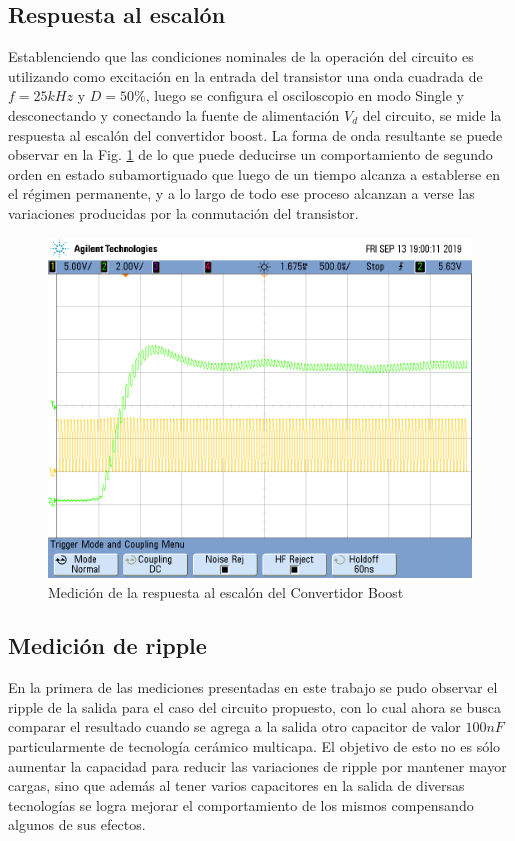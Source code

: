 \subsection{Respuesta al escal\'on}
Establenciendo que las condiciones nominales de la operaci\'on del circuito es utilizando como excitaci\'on en la entrada del transistor una onda cuadrada de $f = 25kHz$ y $D = 50\%$, luego se configura el osciloscopio en modo Single y desconectando
y conectando la fuente de alimentaci\'on $V_d$ del circuito, se mide la respuesta al escal\'on del convertidor boost. La forma de onda resultante se puede observar en la Fig. \ref{fig:respuesta_escalon} de lo que puede deducirse un comportamiento
de segundo orden en estado subamortiguado que luego de un tiempo alcanza a establerse en el r\'egimen permanente, y a lo largo de todo ese proceso alcanzan a verse las variaciones producidas por la conmutaci\'on del transistor.

\begin{figure}[H]
    \centering
    \includegraphics[scale=0.4]{../Mediciones/Osciloscopio/Respuesta_Escalon/scope_13.png}
    \caption{Medici\'on de la respuesta al escal\'on del Convertidor Boost}
    \label{fig:respuesta_escalon}
\end{figure}

\subsection{Medici\'on de ripple}
En la primera de las mediciones presentadas en este trabajo se pudo observar el ripple de la salida para el caso del circuito propuesto, con lo cual ahora se busca comparar el resultado cuando se agrega
a la salida otro capacitor de valor $100nF$ particularmente de tecnolog\'ia cer\'amico multicapa. El objetivo de esto no es s\'olo aumentar la capacidad para reducir las variaciones de ripple por mantener mayor cargas, sino que adem\'as
al tener varios capacitores en la salida de diversas tecnolog\'ias se logra mejorar el comportamiento de los mismos compensando algunos de sus efectos.

